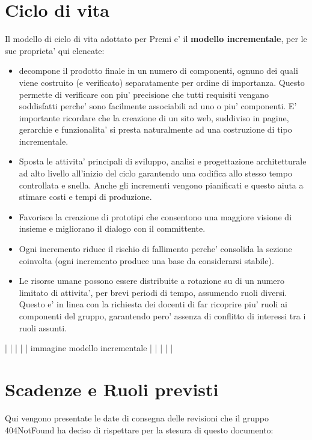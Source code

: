 \section{Ciclo di vita}
Il modello di ciclo di vita adottato per Premi e' il \textbf{modello incrementale}, per le sue proprieta' qui elencate:

\begin{itemize}
	\item decompone il prodotto finale in un numero di componenti, ognuno dei quali viene costruito (e verificato) separatamente per ordine di importanza. Questo permette di verificare con piu' precisione che tutti requisiti vengano soddisfatti perche' sono facilmente associabili ad uno o piu' componenti. E' importante ricordare che la creazione di un sito web, suddiviso in pagine, gerarchie e funzionalita' si presta naturalmente ad una costruzione di tipo incrementale.
	\item Sposta le attivita' principali di sviluppo, analisi e progettazione architetturale ad alto livello all'inizio del ciclo garantendo una codifica allo stesso tempo controllata e snella. Anche gli incrementi vengono pianificati e questo aiuta a stimare costi e tempi di produzione.
	\item Favorisce la creazione di prototipi che consentono una maggiore visione di insieme e migliorano il dialogo con il committente.
	\item Ogni incremento riduce il rischio di fallimento perche' consolida la sezione coinvolta (ogni incremento produce una base da considerarsi stabile).
	\item Le risorse umane possono essere distribuite a rotazione su di un numero limitato di attivita', per brevi periodi di tempo, assumendo ruoli diversi. Questo e' in linea con la richiesta dei docenti di far ricoprire piu' ruoli ai componenti del gruppo, garantendo pero' assenza di conflitto di interessi tra i ruoli assunti.
\end{itemize}	
	
|
|
|
|
|            immagine modello incrementale
|
|
|
|
|


\section{Scadenze e Ruoli previsti}
Qui vengono presentate le date di consegna delle revisioni che il gruppo 404NotFound ha deciso di rispettare per la stesura di questo documento:

